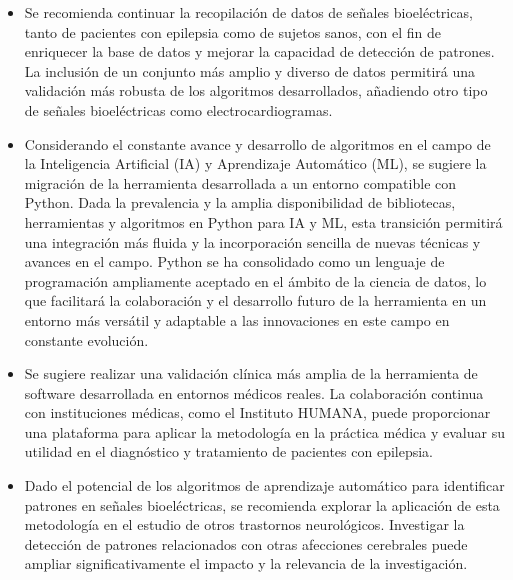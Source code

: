 \begin{itemize}
    \item Se recomienda continuar la recopilación de datos de señales bioeléctricas, tanto de pacientes con epilepsia como de sujetos sanos, con el fin de enriquecer la base de datos y mejorar la capacidad de detección de patrones. La inclusión de un conjunto más amplio y diverso de datos permitirá una validación más robusta de los algoritmos desarrollados, añadiendo otro tipo de señales bioeléctricas como electrocardiogramas.
    
    \item Considerando el constante avance y desarrollo de algoritmos en el campo de la Inteligencia Artificial (IA) y Aprendizaje Automático (ML), se sugiere la migración de la herramienta desarrollada a un entorno compatible con Python. Dada la prevalencia y la amplia disponibilidad de bibliotecas, herramientas y algoritmos en Python para IA y ML, esta transición permitirá una integración más fluida y la incorporación sencilla de nuevas técnicas y avances en el campo. Python se ha consolidado como un lenguaje de programación ampliamente aceptado en el ámbito de la ciencia de datos, lo que facilitará la colaboración y el desarrollo futuro de la herramienta en un entorno más versátil y adaptable a las innovaciones en este campo en constante evolución.

    \item Se sugiere realizar una validación clínica más amplia de la herramienta de software desarrollada en entornos médicos reales. La colaboración continua con instituciones médicas, como el Instituto HUMANA, puede proporcionar una plataforma para aplicar la metodología en la práctica médica y evaluar su utilidad en el diagnóstico y tratamiento de pacientes con epilepsia.

    \item Dado el potencial de los algoritmos de aprendizaje automático para identificar patrones en señales bioeléctricas, se recomienda explorar la aplicación de esta metodología en el estudio de otros trastornos neurológicos. Investigar la detección de patrones relacionados con otras afecciones cerebrales puede ampliar significativamente el impacto y la relevancia de la investigación.
    

    
\end{itemize}
